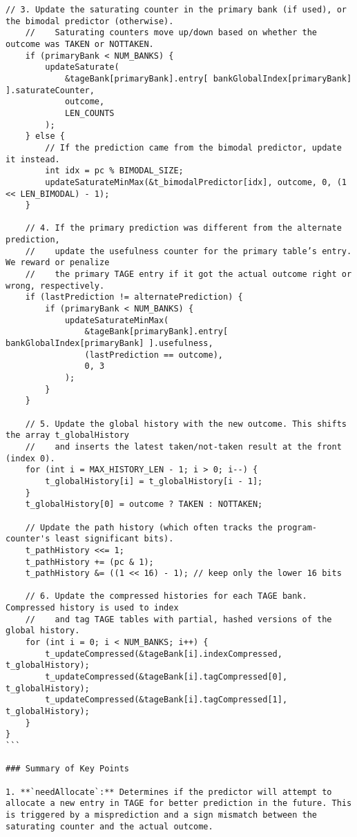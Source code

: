 \documentclass[11pt]{article}
\begin{document}
\begin{Verbatim}[fontsize=\tiny, breaklines=true]
    // 3. Update the saturating counter in the primary bank (if used), or the bimodal predictor (otherwise).
    //    Saturating counters move up/down based on whether the outcome was TAKEN or NOTTAKEN.
    if (primaryBank < NUM_BANKS) {
        updateSaturate(
            &tageBank[primaryBank].entry[ bankGlobalIndex[primaryBank] ].saturateCounter,
            outcome,
            LEN_COUNTS
        );
    } else {
        // If the prediction came from the bimodal predictor, update it instead.
        int idx = pc % BIMODAL_SIZE;
        updateSaturateMinMax(&t_bimodalPredictor[idx], outcome, 0, (1 << LEN_BIMODAL) - 1);
    }

    // 4. If the primary prediction was different from the alternate prediction,
    //    update the usefulness counter for the primary table’s entry. We reward or penalize
    //    the primary TAGE entry if it got the actual outcome right or wrong, respectively.
    if (lastPrediction != alternatePrediction) {
        if (primaryBank < NUM_BANKS) {
            updateSaturateMinMax(
                &tageBank[primaryBank].entry[ bankGlobalIndex[primaryBank] ].usefulness,
                (lastPrediction == outcome),
                0, 3
            );
        }
    }

    // 5. Update the global history with the new outcome. This shifts the array t_globalHistory
    //    and inserts the latest taken/not-taken result at the front (index 0).
    for (int i = MAX_HISTORY_LEN - 1; i > 0; i--) {
        t_globalHistory[i] = t_globalHistory[i - 1];
    }
    t_globalHistory[0] = outcome ? TAKEN : NOTTAKEN;

    // Update the path history (which often tracks the program-counter's least significant bits).
    t_pathHistory <<= 1;
    t_pathHistory += (pc & 1);
    t_pathHistory &= ((1 << 16) - 1); // keep only the lower 16 bits

    // 6. Update the compressed histories for each TAGE bank. Compressed history is used to index
    //    and tag TAGE tables with partial, hashed versions of the global history.
    for (int i = 0; i < NUM_BANKS; i++) {
        t_updateCompressed(&tageBank[i].indexCompressed, t_globalHistory);
        t_updateCompressed(&tageBank[i].tagCompressed[0], t_globalHistory);
        t_updateCompressed(&tageBank[i].tagCompressed[1], t_globalHistory);
    }
}
```

### Summary of Key Points

1. **`needAllocate`:** Determines if the predictor will attempt to allocate a new entry in TAGE for better prediction in the future. This is triggered by a misprediction and a sign mismatch between the saturating counter and the actual outcome.


\end{Verbatim}
\end{document}
